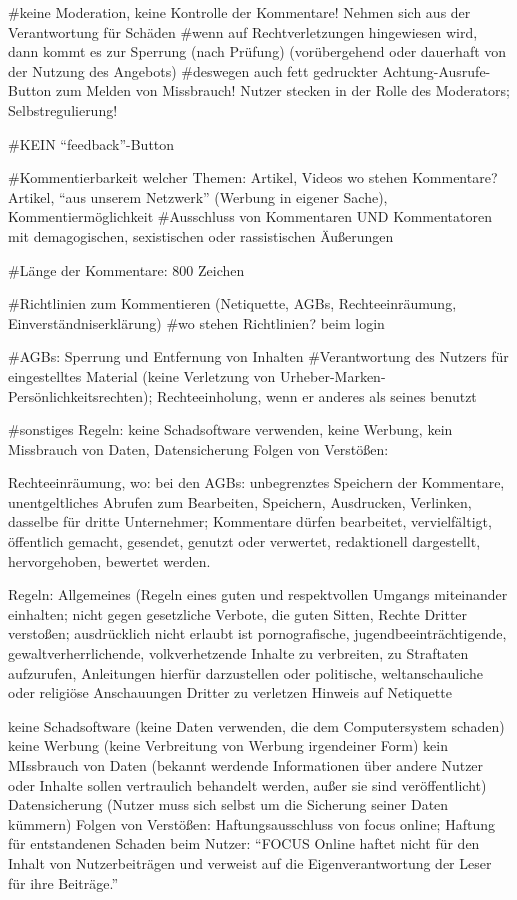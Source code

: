 
#keine Moderation, keine Kontrolle der Kommentare! Nehmen sich aus der Verantwortung für Schäden
#wenn auf Rechtverletzungen hingewiesen wird, dann kommt es zur Sperrung (nach Prüfung) (vorübergehend oder dauerhaft von der Nutzung des Angebots)
#deswegen auch fett gedruckter Achtung-Ausrufe-Button zum Melden von Missbrauch! Nutzer stecken in der Rolle des Moderators; Selbstregulierung!



#KEIN ``feedback''-Button



#Kommentierbarkeit welcher Themen: Artikel, Videos
wo stehen Kommentare? Artikel, ``aus unserem Netzwerk'' (Werbung in eigener Sache), Kommentiermöglichkeit
#Ausschluss von Kommentaren UND Kommentatoren mit demagogischen, sexistischen oder rassistischen Äußerungen



#Länge der Kommentare: 800 Zeichen

#Richtlinien zum Kommentieren (Netiquette, AGBs, Rechteeinräumung, Einverständniserklärung)
#wo stehen Richtlinien? beim login


#AGBs: Sperrung und Entfernung von Inhalten 
			#Verantwortung des Nutzers für eingestelltes Material (keine Verletzung von Urheber-Marken-Persönlichkeitsrechten); Rechteeinholung, wenn er 					anderes als seines benutzt
			
			
#sonstiges Regeln: keine Schadsoftware verwenden, keine Werbung, kein Missbrauch von Daten, Datensicherung 
			Folgen von Verstößen: 
			
			
			
	Rechteeinräumung, wo: bei den AGBs: unbegrenztes Speichern der Kommentare, unentgeltliches Abrufen zum Bearbeiten, Speichern, Ausdrucken, Verlinken, 										dasselbe für dritte Unternehmer; Kommentare dürfen bearbeitet, vervielfältigt, öffentlich gemacht, gesendet, genutzt oder 										verwertet, redaktionell dargestellt, hervorgehoben, bewertet werden.

Regeln: 
	Allgemeines (Regeln eines guten und respektvollen Umgangs miteinander einhalten; nicht gegen gesetzliche Verbote, die guten Sitten, Rechte Dritter verstoßen; 				ausdrücklich nicht erlaubt ist pornografische, jugendbeeinträchtigende, gewaltverherrlichende, volkverhetzende Inhalte zu verbreiten, zu Straftaten aufzurufen, 				Anleitungen hierfür darzustellen oder politische, weltanschauliche oder religiöse Anschauungen Dritter zu verletzen
	Hinweis auf Netiquette
	
	keine Schadsoftware (keine Daten verwenden, die dem Computersystem schaden)
	keine Werbung (keine Verbreitung von Werbung irgendeiner Form)
	kein MIssbrauch von Daten (bekannt werdende Informationen über andere Nutzer oder Inhalte sollen vertraulich behandelt werden, außer sie sind veröffentlicht)
	Datensicherung (Nutzer muss sich selbst um die Sicherung seiner Daten kümmern)
	Folgen von Verstößen: Haftungsausschluss von focus online; Haftung für entstandenen Schaden beim Nutzer: ``FOCUS Online haftet nicht für den Inhalt von Nutzerbeiträgen und verweist auf die Eigenverantwortung der Leser für ihre Beiträge.''

